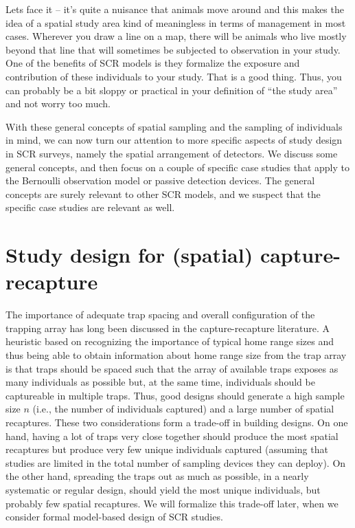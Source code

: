 Lets face it -- it's quite a nuisance that animals move around and
this makes the idea of a spatial study area kind of meaningless in
terms of management in most cases. Wherever you draw a line on a map,
there will be animals who live mostly beyond that line that will
sometimes be subjected to observation in your study.  One of the benefits of SCR
models is they formalize the exposure and contribution of these
individuals to your study. That is a good thing. Thus, you can
probably be a bit sloppy or practical in your definition of ``the
study area'' and not worry too much.


With these general concepts of spatial sampling and the sampling of
individuals in mind, we can now turn our attention to more specific
aspects of study design in SCR surveys, namely the spatial arrangement
of detectors. We discuss some general concepts, and then focus on a
couple of specific case studies that apply to the Bernoulli observation
model or passive detection devices. The general concepts are surely
relevant to other SCR models, and we suspect that the
specific case studies are relevant as well.


\section{Study design for (spatial) capture-recapture}

The importance of adequate trap spacing and overall configuration of
the trapping array has long been discussed in the capture-recapture
literature.  A heuristic based on recognizing the importance of
typical home range sizes \citep{dice:1938, dice:1941} and thus being
able to obtain information about home range size from the trap array
is that traps should be spaced such that the array of available traps
exposes as many individuals as possible but, at the same time,
individuals should be captureable in multiple traps. Thus, good
designs should generate a high sample size $n$ (i.e., the number of
individuals captured) and a large number of spatial recaptures.  These
two considerations form a trade-off in building designs.  On one hand,
having a lot of traps very close together should produce the most
spatial recaptures but produce very few unique individuals captured
(assuming that studies are limited in the total number of sampling
devices they can deploy). On the other hand, spreading the traps out
as much as possible, in a nearly systematic or regular design, should
yield the most unique individuals, but probably few spatial
recaptures.  We will formalize this trade-off later, when we consider
formal model-based design of SCR studies.


